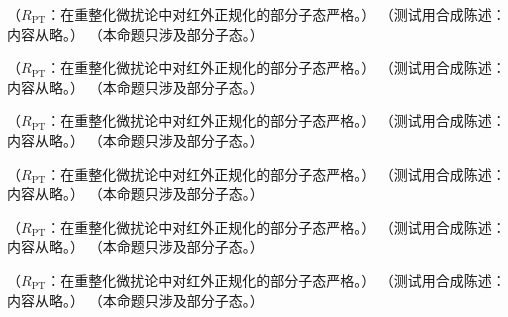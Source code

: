 \begin{proposition}\label{prop:appN-triangle-exact}
（$R_{\mathrm{PT}}$：在重整化微扰论中对红外正规化的部分子态严格。）
（测试用合成陈述：内容从略。）
（本命题只涉及部分子态。）
\end{proposition}

\begin{proposition}\label{prop:appN-ladder}
（$R_{\mathrm{PT}}$：在重整化微扰论中对红外正规化的部分子态严格。）
（测试用合成陈述：内容从略。）
（本命题只涉及部分子态。）
\end{proposition}

\begin{proposition}\label{prop:appN-triangle-cs}
（$R_{\mathrm{PT}}$：在重整化微扰论中对红外正规化的部分子态严格。）
（测试用合成陈述：内容从略。）
（本命题只涉及部分子态。）
\end{proposition}

\begin{proposition}\label{prop:appN-phi36-dis}
（$R_{\mathrm{PT}}$：在重整化微扰论中对红外正规化的部分子态严格。）
（测试用合成陈述：内容从略。）
（本命题只涉及部分子态。）
\end{proposition}

\begin{proposition}\label{prop:appN-massive-photon}
（$R_{\mathrm{PT}}$：在重整化微扰论中对红外正规化的部分子态严格。）
（测试用合成陈述：内容从略。）
（本命题只涉及部分子态。）
\end{proposition}

\begin{proposition}\label{prop:appN-twoloop-algebra}
（$R_{\mathrm{PT}}$：在重整化微扰论中对红外正规化的部分子态严格。）
（测试用合成陈述：内容从略。）
（本命题只涉及部分子态。）
\end{proposition}


